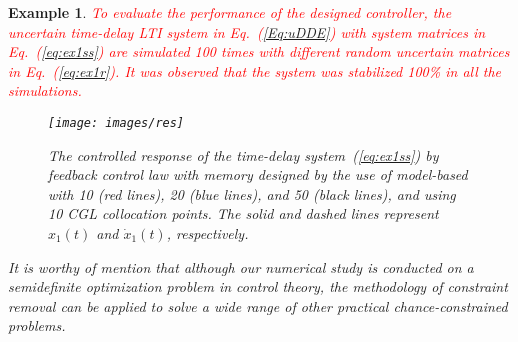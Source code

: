 \documentclass[journal]{IEEEtran}
\newtheorem{exmp}{Example}
\begin{document}
\begin{exmp}
	\textcolor{red}{To evaluate the performance of the designed controller, the uncertain time-delay LTI system in Eq.~(\ref{Eq:uDDE}) with system matrices in Eq.~(\ref{eq:ex1ss}) are simulated 100 times with different random uncertain matrices in Eq.~(\ref{eq:ex1r}). It was observed that the system was stabilized 100\% in all the simulations.}
	\begin{figure}[t]
		\centering %
		\texttt{[image: images/res]}
		\caption{The controlled response of the time-delay system~(\ref{eq:ex1ss}) by feedback control law with memory designed by the use of model-based with 10 (red lines), 20 (blue lines), and 50 (black lines), and using 10 CGL collocation points. The solid and dashed lines represent $ x_1(t) $ and $ \dot x_1(t) $, respectively.}
		\label{fig:res}
	\end{figure}
	It is worthy of mention that although our numerical study is conducted on a semidefinite optimization problem in control theory, the methodology of constraint removal can be applied to solve a wide range of other practical chance-constrained problems.
\end{exmp}
\end{document}
